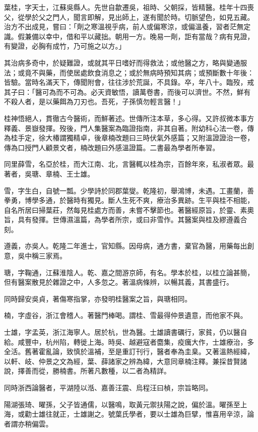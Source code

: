 \begin{pinyinscope}
葉桂，字天士，江蘇吳縣人。先世自歙遷吳，祖時、父朝採，皆精醫。桂年十四喪父，從學於父之門人，聞言即解，見出師上，遂有聞於時。切脈望色，如見五藏。治方不出成見，嘗曰：「劑之寒溫視乎病，前人或偏寒涼，或偏溫養，習者茫無定識。假兼備以幸中，借和平以藏拙。朝用一方。晚易一劑，詎有當哉？病有見證，有變證，必胸有成竹，乃可施之以方。」

其治病多奇中，於疑難證，或就其平日嗜好而得救法；或他醫之方，略與變通服法；或竟不與藥，而使居處飲食消息之；或於無病時預知其病；或預斷數十年後：皆驗。當時名滿天下，傳聞附會，往往涉於荒誕，不具錄。卒，年八十。臨歿，戒其子曰：「醫可為而不可為。必天資敏悟，讀萬卷書，而後可以濟世。不然，鮮有不殺人者，是以藥餌為刀刃也。吾死，子孫慎勿輕言醫！」

桂神悟絕人，貫徹古今醫術，而鮮著述。世傳所注本草，多心得。又許叔微本事方釋義、景嶽發揮。歿後，門人集醫案為臨證指南，非其自著。附幼科心法一卷，傳為桂手定，徐大椿謂獨精卓，後章楠改題曰三時伏氣外感篇；又附溫證證治一卷，傳為口授門人顧景文者，楠改題曰外感溫證篇。二書最為學者所奉習。

同里薛雪，名亞於桂，而大江南、北，言醫輒以桂為宗，百餘年來，私淑者眾。最著者，吳瑭、章楠、王士雄。

雪，字生白，自號一瓢。少學詩於同郡葉燮。乾隆初，舉鴻博，未遇。工畫蘭，善拳勇，博學多通，於醫時有獨見。斷人生死不爽，療治多異跡。生平與桂不相能，自名所居曰掃葉莊，然每見桂處方而善，未嘗不擊節也。著醫經原旨，於靈、素奧旨，具有發揮。世傳濕溫篇，為學者所宗，或曰非雪作。其醫案與桂及繆遵義合刻。

遵義，亦吳人。乾隆二年進士，官知縣。因母病，通方書，棄官為醫，用藥每出創意，吳中稱三家焉。

瑭，字鞠通，江蘇淮陰人。乾、嘉之間游京師，有名。學本於桂，以桂立論甚簡，但有醫案散見於雜證之中，人多忽之。著溫病條辨，以暢其義，其書盛行。

同時歸安吳貞，著傷寒指掌，亦發明桂醫案之旨，與瑭相同。

楠，字虛谷，浙江會稽人。著醫門棒喝。謂桂、雪最得仲景遺意，而他家不與。

士雄，字孟英，浙江海寧人。居於杭，世為醫。士雄讀書礪行，家貧，仍以醫自給。咸豐中，杭州陷，轉徙上海。時吳、越避寇者麕集，疫癘大作，士雄療治，多全活。舊著霍亂論，致慎於溫補，至是重訂刊行，醫者奉為圭臬。又著溫熱經緯，以軒、岐、仲景之文為經，葉、薛諸家之辨為緯，大意同章楠注釋。兼採昔賢諸說，擇善而從，勝楠書。所著凡數種，以二者為精詳。

同時浙西論醫者，平湖陸以湉、嘉善汪震、烏程汪曰楨，宗旨略同。

陽湖張琦、曜孫，父子皆通儒，以醫鳴，取黃元禦扶陽之說，偏於溫。曜孫至上海，或勸士雄往就正，士雄謝之。號葉氏學者，要以士雄為巨擘，惟喜用辛涼，論者謂亦稍偏雲。


\end{pinyinscope}
